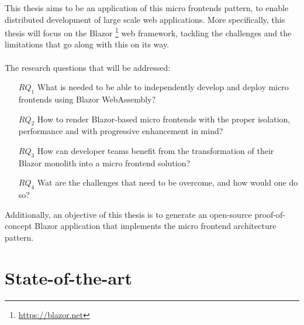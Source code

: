 This thesis aims to be an application of this micro frontends pattern, to enable
distributed development of large scale web applications. More specifically, this
thesis will focus on the Blazor \footnote{\href{https://blazor.net}{https://blazor.net}} web framework, tackling the challenges and the
limitations that go along with this on its way.\\\\\noindent The research
questions that will be addressed:
\begin{itemize}
    \item[$RQ_1$] What is needed to be able to independently develop and deploy micro
    frontends using Blazor WebAssembly?
    \item[$RQ_2$] How to render Blazor-based micro frontends with the proper isolation,
    performance and with progressive enhancement in mind?
    \item[$RQ_3$] How can developer teams benefit from the transformation of their
    Blazor monolith into a micro frontend solution?
    \item[$RQ_4$] Wat are the challenges that need to be overcome, and how would one do
    so? 
    \item[]
\end{itemize}

\noindent Additionally, an objective of this thesis is to generate an open-source
proof-of-concept Blazor application that implements the micro frontend
architecture pattern.

\section{State-of-the-art}
\label{sec:state-of-the-art}

%
%


